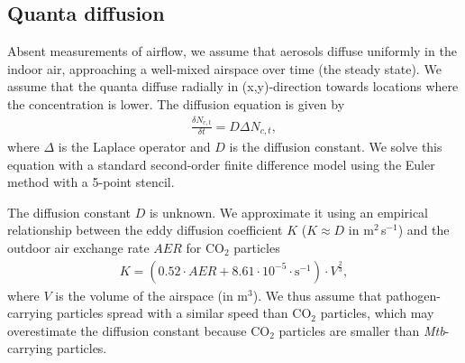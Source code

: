 \documentclass[fleqn,11pt]{wlscirep_supp}
\begin{document}
\subsection{Quanta diffusion}\label{sec:quanta-diffusion}

Absent measurements of airflow, we assume that aerosols diffuse uniformly in the indoor air, approaching a well-mixed airspace over time (the steady state). We assume that the quanta diffuse radially in (x,y)-direction towards locations where the concentration is lower. The diffusion equation is given by 
\begin{align}\label{eq:diffusion}
    \frac{\delta N_{c,t}}{\delta t} = D \Delta N_{c,t},
\end{align}
where $\Delta$ is the Laplace operator and $D$ is the diffusion constant. We solve this equation with a standard second-order finite difference model using the Euler method with a 5-point stencil. 

The diffusion constant $D$ is unknown. We approximate it using an empirical relationship between the eddy diffusion coefficient $K$ ($K \approx D$ in m$^2$\,s$^{-1}$) and the outdoor air exchange rate $AER$ for CO$_2$ particles\cite{Cheng2011EnvSciTech,Foat2020BE}
\begin{align}
    K = (0.52 \cdot AER + 8.61\cdot10^{-5} \cdot \text{s}^{-1}) \cdot V^{\frac{2}{3}},
\end{align}
where $V$ is the volume of the airspace (in m$^3$). We thus assume that pathogen-carrying particles spread with a similar speed than CO$_2$ particles, which may overestimate the diffusion constant because CO$_2$ particles are smaller than \emph{Mtb}-carrying particles.
\end{document}
